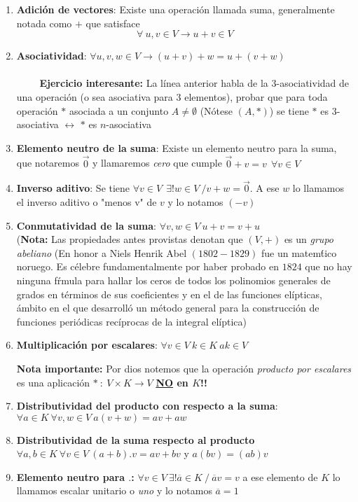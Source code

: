 \documentclass[a4paper,spanish]{article}
\numberwithin{equation}{section}
\begin{document}
\begin{enumerate}
\item \textbf{Adici\'on de vectores}: Existe una operaci\'on llamada suma, generalmente notada como $+$ que satisface \\
\[\forall \ u,v \in V \longrightarrow u+v \in V\]
\item \textbf{Asociatividad}: $\forall u,v,w\in V \longrightarrow \left({u+v}\right)+w = u+\left({v+w}\right)$ \\
\\
$\qquad$ \textbf{Ejercicio interesante:} La l\'inea anterior habla de la $3$-asociatividad de una operaci\'on (o sea asociativa para 3 elementos), probar que para toda operaci\'on $*$ asociada a un conjunto $A \neq \emptyset$ (N\'otese $\left({A,*}\right)$) se tiene $*$ es $3$-asociativa $\leftrightarrow$ $*$ es $n$-asociativa
\item \textbf{Elemento neutro de la suma}: Existe un elemento neutro para la suma, que notaremos $\vec{0}$ y llamaremos \textit{cero} que cumple $\vec{0}+v=v \ \  \forall v \in V$
\item \textbf{Inverso aditivo}: Se tiene $\forall v \in V \ \ \exists ! w \in V \ / v+w=\vec{0}$. A ese $w$ lo llamamos el inverso aditivo o "menos v" de $v$ y lo notamos $\left({- v}\right)$
\item \textbf{Conmutatividad de la suma}: $\forall v,w \in V \ u+v=v+u$
\\
(\textbf{Nota:} Las propiedades antes provistas denotan que $\left({V,+}\right)$ es un \textit{grupo abeliano} (En honor a Niels Henrik Abel $(1802-1829)$ fue un matem\'tico noruego. Es c\'elebre fundamentalmente por haber probado en $1824$ que no hay ninguna f\'rmula para hallar los ceros de todos los polinomios generales de grados  en t\'erminos de sus coeficientes y en el de las funciones el\'ipticas, \'ambito en el que desarroll\'o un m\'etodo general para la construcci\'on de funciones peri\'odicas rec\'iprocas de la integral el\'iptica)

\item \textbf{Multiplicaci\'on por escalares}: $\forall v \in V \ k\in K \ ak\in V$

\textbf{Nota importante:} Por dios notemos que la operaci\'on \textit{producto por escalares} es una aplicaci\'on $ \ast \ : \ {V} \times {K} \rightarrow V$ \textbf{\underline{NO} en $K$!!}

\item \textbf{Distributividad del producto con respecto a la suma}: $ \forall a \in K \ \forall v,w \in V \ a\left({v+w}\right)=av+aw$

\item \textbf{Distributividad de la suma respecto al producto} $\forall a,b \in K \ \forall v \in V \ \left({a+b}\right).v=av+bv $ y $ a\left({bv}\right)=\left({ab}\right)v $

\item \textbf{Elemento neutro para $.$:} $\forall v\in V \ \exists!\overline{a} \in K \ / \ \overline{a}v=v$ a ese elemento de $K$ lo llamamos escalar unitario o \textit{uno} y lo notamos $\overline{a}=1$
\end{enumerate}
\end{document}
